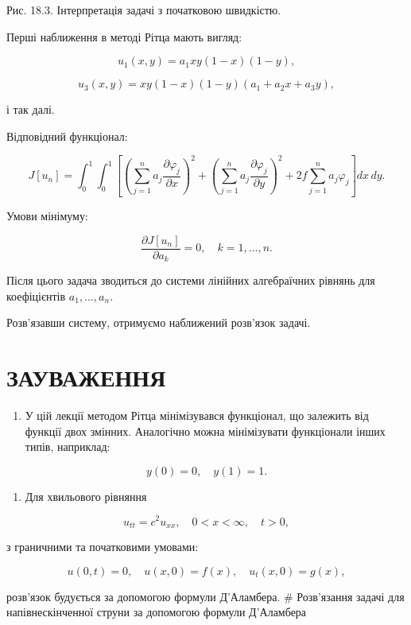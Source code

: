 \documentclass[
  ukrainian,
]{article}
\providecommand{\tightlist}{%
  \setlength{\itemsep}{0pt}\setlength{\parskip}{0pt}}
\begin{document}
Рис. 18.3. Інтерпретація задачі з початковою швидкістю.

Перші наближення в методі Рітца мають вигляд:

\[
u_1(x,y)=a_1xy(1-x)(1-y),
\]

\[
u_3(x,y)=xy(1-x)(1-y)(a_1+a_2x+a_3y),
\]

і так далі.

Відповідний функціонал:

\[
J[u_n] = \int_0^1 \int_0^1 \left[\left(\sum_{j=1}^n a_j \frac{\partial \varphi_j}{\partial x}\right)^2 + \left(\sum_{j=1}^n a_j \frac{\partial \varphi_j}{\partial y}\right)^2 + 2f \sum_{j=1}^n a_j \varphi_j\right] dx\,dy.
\]

Умови мінімуму:

\[
\frac{\partial J[u_n]}{\partial a_k}=0,\quad k=1,\dots,n.
\]

Після цього задача зводиться до системи лінійних алгебраїчних рівнянь
для коефіцієнтів \(a_1,\dots,a_n\).

Розв'язавши систему, отримуємо наближений розв'язок задачі.

\section{ЗАУВАЖЕННЯ}\label{ux437ux430ux443ux432ux430ux436ux435ux43dux43dux44f-9}

\begin{enumerate}
\def\labelenumi{\arabic{enumi}.}
\tightlist
\item
  У цій лекції методом Рітца мінімізувався функціонал, що залежить від
  функції двох змінних. Аналогічно можна мінімізувати функціонали інших
  типів, наприклад:
\end{enumerate}

\[
y(0)=0,\quad y(1)=1.
\]

\begin{enumerate}
\def\labelenumi{\arabic{enumi}.}
\setcounter{enumi}{1}
\tightlist
\item
  Для хвильового рівняння
\end{enumerate}

\[
u_{tt}=c^2u_{xx}, \quad 0<x<\infty,\quad t>0,
\]

з граничними та початковими умовами:

\[
u(0,t)=0,\quad u(x,0)=f(x),\quad u_t(x,0)=g(x),
\]

розв'язок будується за допомогою формули Д'Аламбера. \# Розв'язання
задачі для напівнескінченної струни за допомогою формули Д'Аламбера
\end{document}
